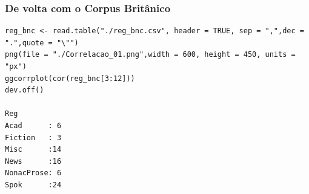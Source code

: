 \documentclass[graphics,14pt]{beamer}
\begin{document}
\begin{frame}[t,fragile=singleslide]
\frametitle{De volta com o Corpus Britânico \cite{Levshina2015}}

\begin{lstlisting}
reg_bnc <- read.table("./reg_bnc.csv", header = TRUE, sep = ",",dec = ".",quote = "\"")
png(file = "./Correlacao_01.png",width = 600, height = 450, units = "px")
ggcorrplot(cor(reg_bnc[3:12]))
dev.off()

Reg
Acad      : 6   
Fiction   : 3   
Misc      :14   
News      :16   
NonacProse: 6   
Spok      :24 
\end{lstlisting}
\end{frame}
\end{document}
